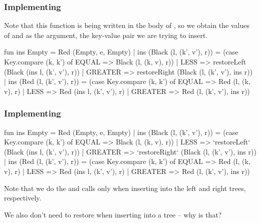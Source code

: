 \documentclass[aspectratio=169, handout]{beamer}
\begin{document}
\begin{frame}[fragile]
  \frametitle{Implementing }

  Note that this function is being written in the body of , so
  we obtain the values of  and  as the argument, the
  key-value pair we are trying to insert.

  \pause
  \vspace{\fill}

  \begin{codeblock}
    fun ins Empty = Red (Empty, e, Empty)
      | ins (Black (l, (k', v'), r)) =
          (case Key.compare (k, k') of
            EQUAL   => Black (l, (k, v), r))
          | LESS    => restoreLeft (Black (ins l, (k', v'), r))
          | GREATER => restoreRight (Black (l, (k', v'), ins r))
      | ins (Red (l, (k', v'), r)) =
          (case Key.compare (k, k') of
            EQUAL   => Red (l, (k, v), r)
          | LESS    => Red (ins l, (k', v'), r)
          | GREATER => Red (l, (k', v'), ins r))
  \end{codeblock}
\end{frame}

\begin{frame}[fragile]
  \frametitle{Implementing }

  {\small
  \begin{codeblock}
    fun ins Empty = Red (Empty, e, Empty)
      | ins (Black (l, (k', v'), r)) =
          (case Key.compare (k, k') of
            EQUAL   => Black (l, (k, v), r))
          | LESS    => `restoreLeft` (Black (ins l, (k', v'), r))
          | GREATER => `restoreRight` (Black (l, (k', v'), ins r))
      | ins (Red (l, (k', v'), r)) =
          (case Key.compare (k, k') of
            EQUAL   => Red (l, (k, v), r)
          | LESS    => Red (ins l, (k', v'), r)
          | GREATER => Red (l, (k', v'), ins r))
  \end{codeblock}
  }

  \pause
  \vspace{\fill}

  Note that we do the  and  calls only
  when inserting into the left and right trees, respectively.

  \pause
  \vspace{\fill}

  We also don't need to restore when inserting into a  tree --
  why is that?

\end{frame}
\end{document}
